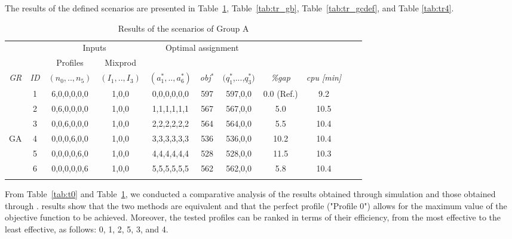 \documentclass[review,12pt, 3p, times]{elsarticle}
\begin{document}
The results of the defined scenarios are presented in Table~\ref{tab:tr_ga}, Table~\ref{tab:tr_gb}, Table~\ref{tab:tr_gcdef}, and Table \ref{tab:tr4}. 	
								
\setlength{\tabcolsep}{3pt}
\setcounter{table}{2}
\begin{longtable}{|c|c|c|c|c|c|c|c|c|r|r|}
    \hline
    & & \multicolumn{2}{c|}{Inputs} & \multicolumn{3}{c|}{Optimal assignment} & &  \\
    & \multicolumn{1}{c|}{ } & \multicolumn{1}{c|}{Profiles} & \multicolumn{1}{c|}{Mixprod}& \multicolumn{1}{c}{}  & \multicolumn{2}{c|}{} &\multicolumn{1}{c|}{}&\\
    \it{GR} & \it{ID} & \multicolumn{1}{c|}{$(n_0,..,n_5)$} & \multicolumn{1}{c|}{$(I_1,..,I_3)$} & {$(a^*_1,..,a^*_6)$} & \it{obj}$^*$ & $(q^*_1$,...,$q^*_3)$  & \it{\%gap} & \it{ cpu [min]}  \\
    \hline
	        & 1       & 6,0,0,0,0,0                         & 1,0,0                               & 0,0,0,0,0,0          & 597          & 597,0,0                                    & 0.0 (Ref.)     & 9.2     \\
	        & 2       & 0,6,0,0,0,0                         & 1,0,0                               & 1,1,1,1,1,1          & 567          & 567,0,0                                    & 5.0    & 10.5     \\
	        & 3       & 0,0,6,0,0,0                         & 1,0,0                               & 2,2,2,2,2,2          & 564          & 564,0,0                                    & 5.5    & 10.4  \\
	{GA}%
	        & 4       & 0,0,0,6,0,0                         & 1,0,0                               & 3,3,3,3,3,3          & 536          & 536,0,0                                    & 10.2    & 10.4 \\
	        & 5       & 0,0,0,0,6,0                         & 1,0,0                               & 4,4,4,4,4,4          & 528          & 528,0,0                                    & 11.5     & 10.3\\
	        & 6       & 0,0,0,0,0,6                         & 1,0,0                               & 5,5,5,5,5,5          & 562          & 562,0,0                                    & 5.8     & 10.4  \\
	\hline
	\caption{Results of the scenarios of Group A}
	\label{tab:tr_ga}
\end{longtable}


From Table~\ref{tab:t0} and Table~\ref{tab:tr_ga}, we conducted a comparative analysis of the results obtained through simulation and those obtained through .  results show that the two methods are equivalent and that the perfect profile ("Profile 0") allows for the maximum value of the objective function to be achieved. Moreover, the tested profiles can be ranked in terms of their efficiency, from the most effective to the least effective, as follows: 0, 1, 2, 5, 3, and 4. 
\end{document}
